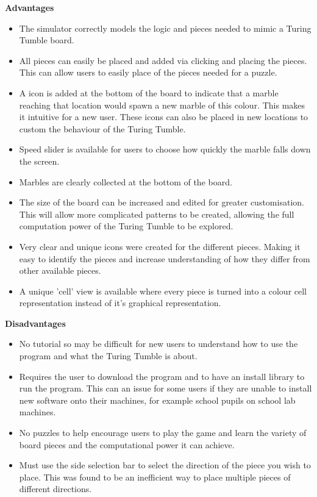 \documentclass{l4proj}
\begin{document}
\textbf{Advantages}
\begin{itemize}
    \item The simulator correctly models the logic and pieces needed to mimic a Turing Tumble board.
    \item All pieces can easily be placed and added via clicking and placing the pieces. This can allow users to easily place of the pieces needed for a puzzle.
    \item A icon is added at the bottom of the board to indicate that a marble reaching that location would spawn a new marble of this colour. This makes it intuitive for a new user. These icons can also be placed in new locations to custom the behaviour of the Turing Tumble.
    \item Speed slider is available for users to choose how quickly the marble falls down the screen.
    \item Marbles are clearly collected at the bottom of the board.
    \item The size of the board can be increased and edited for greater customisation. This will allow more complicated patterns to be created, allowing the full computation power of the Turing Tumble to be explored.
    \item Very clear and unique icons were created for the different pieces. Making it easy to identify the pieces and increase understanding of how they differ from other available pieces.
    \item A unique 'cell' view is available where every piece is turned into a colour cell representation instead of it's graphical representation. 
\end{itemize}

\textbf{Disadvantages}
\begin{itemize}
    \item No tutorial so may be difficult for new users to understand how to use the program and what the Turing Tumble is about.
    \item Requires the user to download the program and to have an install library to run the program. This can an issue for some users if they are unable to install new software onto their machines, for example school pupils on school lab machines.
    \item No puzzles to help encourage users to play the game and learn the variety of board pieces and the computational power it can achieve.
    \item Must use the side selection bar to select the direction of the piece you wish to place. This was found to be an inefficient way to place multiple pieces of different directions.
\end{itemize}
\end{document}
